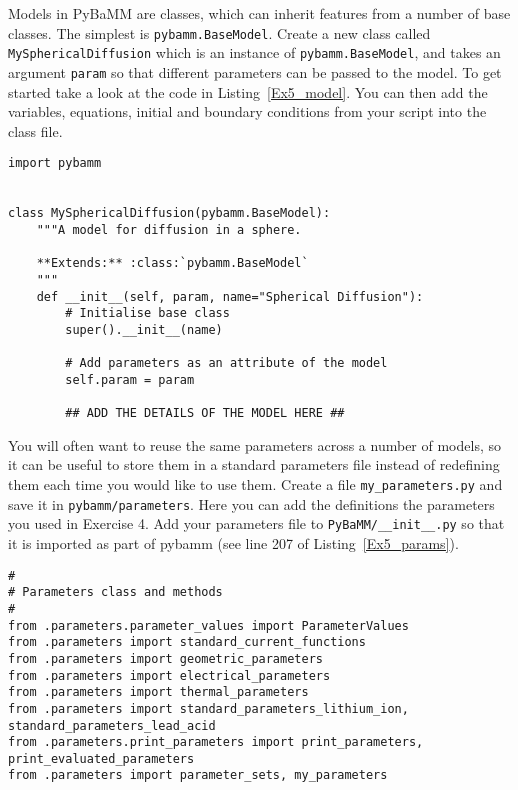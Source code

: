 \documentclass[a4paper,11pt]{article}
\begin{document}
Models in PyBaMM are classes, which can inherit features from a number of base classes. The simplest is \texttt{pybamm.BaseModel}. Create a new class called \texttt{MySphericalDiffusion} which is an instance of \texttt{pybamm.BaseModel}, and takes an argument \texttt{param} so that different parameters can be passed to the model. To get started take a look at the code in Listing~\ref{Ex5_model}. You can then add the variables, equations, initial and boundary conditions from your script into the class file.


\begin{lstlisting}[label={Ex5_model},caption=Creating you new model.]
import pybamm


class MySphericalDiffusion(pybamm.BaseModel):
    """A model for diffusion in a sphere.

    **Extends:** :class:`pybamm.BaseModel`
    """
    def __init__(self, param, name="Spherical Diffusion"):
        # Initialise base class
        super().__init__(name)

        # Add parameters as an attribute of the model
        self.param = param

        ## ADD THE DETAILS OF THE MODEL HERE ##
\end{lstlisting}

You will often want to reuse the same parameters across a number of models, so it can be useful to store them in a standard parameters file instead of redefining them each time you would like to use them. Create a file \texttt{my\_parameters.py} and save it in \texttt{pybamm/parameters}. Here you can add the definitions the parameters you used in Exercise 4. Add your parameters file to \texttt{PyBaMM/\_\_init\_\_.py} so that it is imported as part of pybamm (see line 207 of Listing~\ref{Ex5_params}).

\begin{lstlisting}[label={Ex5_params},caption=Adding your parameters to the init file., firstnumber=197]
#
# Parameters class and methods
#
from .parameters.parameter_values import ParameterValues
from .parameters import standard_current_functions
from .parameters import geometric_parameters
from .parameters import electrical_parameters
from .parameters import thermal_parameters
from .parameters import standard_parameters_lithium_ion, standard_parameters_lead_acid
from .parameters.print_parameters import print_parameters, print_evaluated_parameters
from .parameters import parameter_sets, my_parameters
\end{lstlisting}
\end{document}
